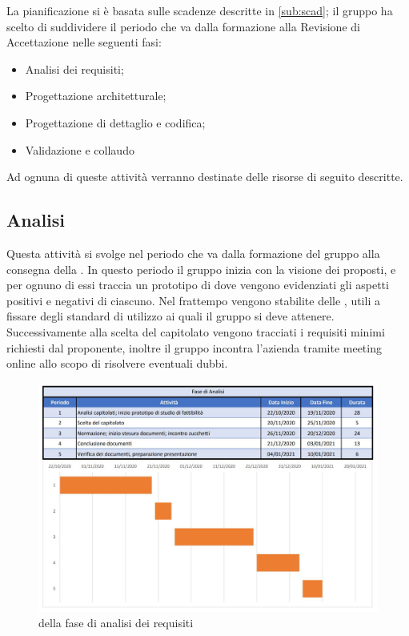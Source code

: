 \documentclass[../piano_di_progetto.tex]{subfiles}
\begin{document}
La pianificazione si è basata sulle scadenze descritte in \ref{sub:scad}; il gruppo ha scelto di suddividere il periodo che va dalla formazione alla Revisione di Accettazione nelle seguenti fasi:
\begin{itemize}
\item Analisi dei requisiti;
\item Progettazione architetturale;
\item Progettazione di dettaglio e codifica;
\item Validazione e collaudo
\end{itemize}
Ad ognuna di queste attività verranno destinate delle risorse di seguito descritte.


\subsection{Analisi}%
\label{sub:analisi}
Questa attività si svolge nel periodo che va dalla formazione del gruppo alla consegna della . In questo periodo il gruppo inizia con la visione dei  proposti, e per ognuno di essi traccia un prototipo di  dove vengono evidenziati gli aspetti positivi e negativi di ciascuno. Nel frattempo vengono stabilite delle , utili a fissare degli standard di utilizzo ai quali il gruppo si deve attenere. Successivamente alla scelta del capitolato vengono tracciati i requisiti minimi richiesti dal proponente, inoltre il gruppo incontra l’azienda tramite meeting online allo scopo di risolvere eventuali dubbi. 

\begin{figure}[H]
\centering
\includegraphics[width=12cm]{fase_analisi}
\caption{  della fase di analisi dei requisiti}
\end{figure}
\end{document}
